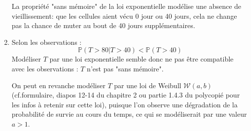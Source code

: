 \documentclass[a4paper,oneside,12pt]{article}
\theoremstyle{plain}
\def\P{{\mathbb P}}
\begin{document}
\begin{enumerate}
    La propriété "sans mémoire" de la loi exponentielle modélise une absence de vieillissement: que les cellules aient vécu 0 jour ou 40 jours, cela ne change pas la chance de muter au bout de 40 jours supplémentaires.
    
    \item Selon les observations :
    $$\P(T> 80 | T>40) < \P(T>40)$$
    Modéliser $T$ par une loi exponentielle semble donc ne pas être compatible avec les observations : $T$ n'est pas "sans mémoire".
    
    On peut en revanche modéliser $T$ par une loi de Weibull $\mathcal{W}(a,b)$ (cf.formulaire, diapos 12-14 du chapitre 2 ou partie 1.4.3 du polycopié pour les infos à retenir sur cette loi), puisque l'on observe une dégradation de la probabilité de survie au cours du temps, ce qui se modéliserait par une valeur $a > 1$.
    
\end{enumerate}
\end{document}
